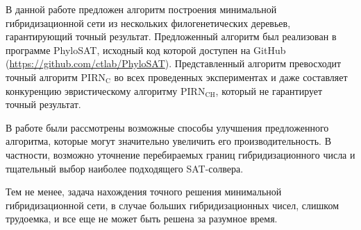 \FloatBarrier
\startconclusionpage

В данной работе предложен алгоритм построения минимальной гибридизационной сети из нескольких филогенетических деревьев, гарантирующий точный результат.
Предложенный алгоритм был реализован в программе PhyloSAT, исходный код которой доступен на GitHub (\url{https://github.com/ctlab/PhyloSAT}).
Представленный алгоритм превосходит точный алгоритм $\mathrm{PIRN_C}$ во всех проведенных экспериментах и даже составляет конкуренцию эвристическому алгоритму $\mathrm{PIRN_{CH}}$, который не гарантирует точный результат.

В работе были рассмотрены возможные способы улучшения предложенного алгоритма, которые могут значительно увеличить его производительность. В частности, возможно уточнение перебираемых границ гибридизационного числа и тщательный выбор наиболее подходящего SAT-солвера.

Тем не менее, задача нахождения точного решения минимальной гибридизационной сети, в случае больших гибридизационных чисел, слишком трудоемка, и все еще не может быть решена за разумное время.
